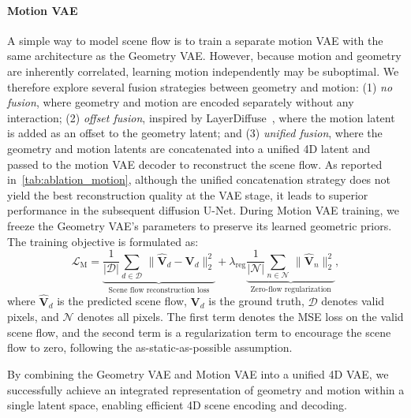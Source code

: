 \paragraph{Motion VAE}
A simple way to model scene flow is to train a separate motion VAE with the same architecture as the Geometry VAE.
However, because motion and geometry are inherently correlated,
learning motion independently may be suboptimal.
We therefore explore several fusion strategies between geometry and motion:
(1) \textit{no fusion}, where geometry and motion are encoded separately without any interaction;
(2) \textit{offset fusion}, inspired by LayerDiffuse~\cite{zhang2024layerdiffuse},
where the motion latent is added as an offset to the geometry latent; and
(3) \textit{unified fusion}, where the geometry and motion latents are concatenated into a unified 4D latent
and passed to the motion VAE decoder to reconstruct the scene flow.
As reported in~\cref{tab:ablation_motion}, although the unified concatenation strategy does not yield the best reconstruction quality at the VAE stage,
it leads to superior performance in the subsequent diffusion U-Net.
During Motion VAE training, we freeze the Geometry VAE's parameters to preserve its learned geometric priors.
The training objective is formulated as:
\begin{equation}
\label{eq:motion_loss}
\mathcal{L}_{\text{M}} = 
\underbrace{
\frac{1}{|\mathcal{D}|} \sum_{d \in \mathcal{D}} \, \| \hat{\bm{V}}_d - \bm{V}_d \|_2^2
}_{\text{Scene flow reconstruction loss}}
+ \lambda_{\text{reg}} \underbrace{
\frac{1}{|\mathcal{N}|} \sum_{n \in \mathcal{N}} \, \| \hat{\bm{V}}_n \|_2^2
}_{\text{Zero-flow regularization}},
\end{equation}
where $\hat{\bm{V}}_d$ is the predicted scene flow, ${\bm{V}}_d$ is the ground truth,
$\mathcal{D}$ denotes valid pixels,
and $\mathcal{N}$ denotes all pixels.
The first term denotes the MSE loss on the valid scene flow,
and the second term is a regularization term to encourage the scene flow to zero,
following the as-static-as-possible assumption. 


By combining the Geometry VAE and Motion VAE into a unified 4D VAE, 
we successfully achieve an integrated representation of geometry and motion within a single latent space, 
enabling efficient 4D scene encoding and decoding.

